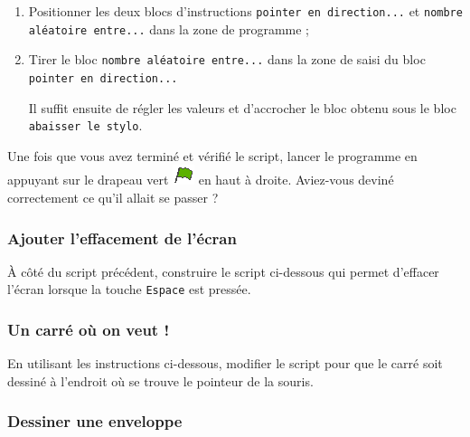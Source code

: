 \begin{enumerate}
\item Positionner les deux blocs d'instructions \texttt{pointer en direction...} et \texttt{nombre aléatoire entre...} dans la zone de programme ;


\item Tirer le bloc \texttt{nombre aléatoire entre...} dans la zone de saisi du bloc \texttt{pointer en direction...}


Il suffit ensuite de régler les valeurs et d'accrocher le bloc obtenu sous le bloc \texttt{abaisser le stylo}.
\end{enumerate}



Une fois que vous avez terminé et vérifié le script, lancer le programme en appuyant sur le drapeau vert \includegraphics[width=.7cm]{./images/scratch/DrapeauVert} en haut à droite. Aviez-vous deviné correctement ce qu'il allait se passer ?




\subsubsection{Ajouter l'effacement de l'écran}

À côté du script précédent, construire le script ci-dessous qui permet d'effacer l'écran lorsque la touche \texttt{Espace} est pressée.







\subsubsection{Un carré où on veut !}

En utilisant les instructions ci-dessous, modifier le script pour que le carré soit dessiné à l'endroit où se trouve le pointeur de la souris.



\subsubsection{Dessiner une enveloppe}

